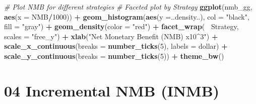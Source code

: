 \documentclass[
]{article}
\newenvironment{Shaded}{\begin{snugshade}}{\end{snugshade}}
\newcommand{\CommentTok}[1]{\textcolor[rgb]{0.56,0.35,0.01}{\textit{#1}}}
\newcommand{\DataTypeTok}[1]{\textcolor[rgb]{0.13,0.29,0.53}{#1}}
\newcommand{\DecValTok}[1]{\textcolor[rgb]{0.00,0.00,0.81}{#1}}
\newcommand{\KeywordTok}[1]{\textcolor[rgb]{0.13,0.29,0.53}{\textbf{#1}}}
\newcommand{\NormalTok}[1]{#1}
\newcommand{\OperatorTok}[1]{\textcolor[rgb]{0.81,0.36,0.00}{\textbf{#1}}}
\newcommand{\StringTok}[1]{\textcolor[rgb]{0.31,0.60,0.02}{#1}}
\begin{document}
\begin{Shaded}
\begin{Highlighting}[]
\CommentTok{# Plot NMB for different strategies}
\CommentTok{# Faceted plot by Strategy}
\KeywordTok{ggplot}\NormalTok{(nmb_gg, }\KeywordTok{aes}\NormalTok{(}\DataTypeTok{x =}\NormalTok{ NMB}\OperatorTok{/}\DecValTok{1000}\NormalTok{)) }\OperatorTok{+}
\StringTok{  }\KeywordTok{geom_histogram}\NormalTok{(}\KeywordTok{aes}\NormalTok{(}\DataTypeTok{y =}\NormalTok{..density..), }\DataTypeTok{col =} \StringTok{"black"}\NormalTok{, }\DataTypeTok{fill =} \StringTok{"gray"}\NormalTok{) }\OperatorTok{+}
\StringTok{  }\KeywordTok{geom_density}\NormalTok{(}\DataTypeTok{color =} \StringTok{"red"}\NormalTok{) }\OperatorTok{+}
\StringTok{  }\KeywordTok{facet_wrap}\NormalTok{(}\OperatorTok{~}\StringTok{ }\NormalTok{Strategy, }\DataTypeTok{scales =} \StringTok{"free_y"}\NormalTok{) }\OperatorTok{+}
\StringTok{  }\KeywordTok{xlab}\NormalTok{(}\StringTok{"Net Monetary Benefit (NMB) x10^3"}\NormalTok{) }\OperatorTok{+}
\StringTok{  }\KeywordTok{scale_x_continuous}\NormalTok{(}\DataTypeTok{breaks =} \KeywordTok{number_ticks}\NormalTok{(}\DecValTok{5}\NormalTok{), }\DataTypeTok{labels =}\NormalTok{ dollar) }\OperatorTok{+}\StringTok{ }
\StringTok{  }\KeywordTok{scale_y_continuous}\NormalTok{(}\DataTypeTok{breaks =} \KeywordTok{number_ticks}\NormalTok{(}\DecValTok{5}\NormalTok{)) }\OperatorTok{+}\StringTok{ }
\StringTok{  }\KeywordTok{theme_bw}\NormalTok{()}
\end{Highlighting}
\end{Shaded}

\hypertarget{incremental-nmb-inmb}{%
\section{04 Incremental NMB (INMB)}\label{incremental-nmb-inmb}}
\end{document}
